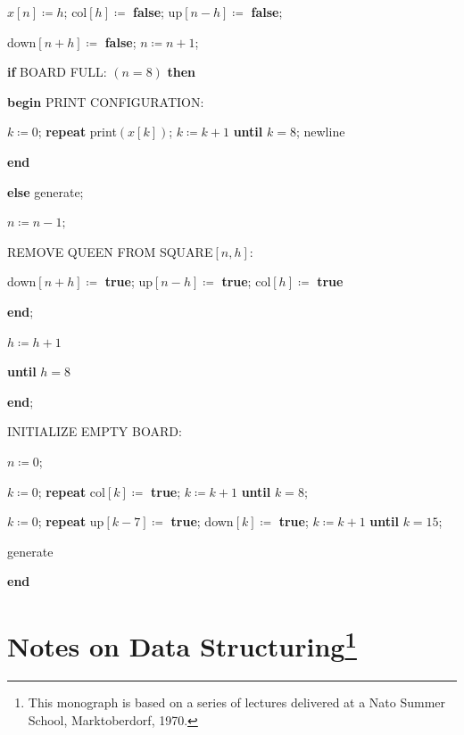 \documentclass[twoside,11pt]{book}
\begin{document}
\noindent
\quad \quad \quad \quad \quad $x[n] \coloneq h$; col$[h]\coloneq$ \textbf{false}; up$[n-h]\coloneq$ \textbf{false};

\noindent
\quad \quad \quad \quad \quad down$[n+h]\coloneq$ \textbf{false}; $n\coloneq n + 1$;

\noindent
\quad \quad \quad \quad \textbf{if} BOARD FULL: $(n = 8)$ \textbf{then}

\noindent
\quad \quad \quad \quad \textbf{begin} PRINT CONFIGURATION:

\noindent
\quad \quad \quad \quad \quad $k\coloneq 0$; \textbf{repeat} print$(x[k])$; $k\coloneq k + 1$ \textbf{until} $k = 8$; newline


\noindent
\quad \quad \quad \quad \textbf{end}

\noindent
\quad \quad \quad \textbf{else} generate;

\noindent
\quad \quad \quad \quad $n \coloneq n - 1;$

\noindent
\quad \quad \quad \quad  REMOVE QUEEN FROM SQUARE$[n,h]$:

\noindent
\quad \quad \quad \quad \quad down$[n+h]\coloneq$ \textbf{true}; up$[n-h] \coloneq$ \textbf{true}; col$[h]\coloneq$ \textbf{true}

\noindent
\quad \quad \quad \textbf{end};

\noindent
\quad \quad \quad $h\coloneq h + 1$

\noindent
\quad \quad \textbf{until} $h = 8$

\noindent
\quad \textbf{end};

\noindent
\quad INITIALIZE EMPTY BOARD:

\noindent
\quad \quad $n \coloneq 0$;

\noindent
\quad \quad $k\coloneq 0$; \textbf{repeat} col$[k] \coloneq$ \textbf{true}; $k\coloneq k + 1$ \textbf{until} $k = 8$;

\noindent
\quad \quad $k\coloneq 0$; \textbf{repeat} up$[k-7] \coloneq$ \textbf{true}; down$[k] \coloneq$ \textbf{\textbf{true}}; $k\coloneq k + 1$ \textbf{until} $k=15$;

\noindent
\quad generate

\noindent
\textbf{end}
\clearpage
\clearpage
\chapter[Notes on Data Structuring]{Notes on Data Structuring\footnote{This monograph is based on a series of lectures delivered at a Nato Summer School, Marktoberdorf, 1970.}}
\end{document}
